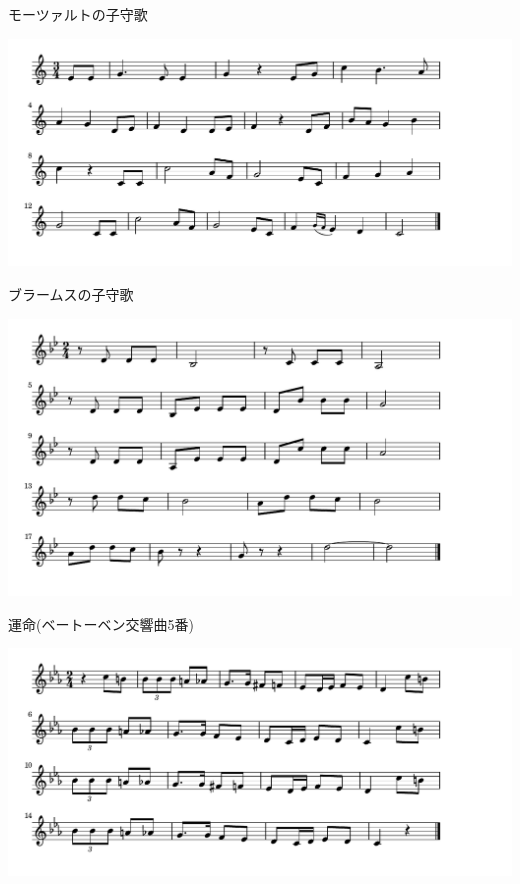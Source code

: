 \documentclass[a4paper]{ltjsarticle}
\begin{document}
\vspace{-10mm} \hspace{10mm}
モーツァルトの子守歌

\includegraphics[clip]{brahmskomori_crop.pdf}

\vspace{-10mm} \hspace{10mm}
ブラームスの子守歌

\includegraphics[clip]{unmei_crop.pdf}

\vspace{-10mm} \hspace{10mm}
運命(ベートーベン交響曲5番)

\includegraphics[clip]{habanera_crop.pdf}
\end{document}
